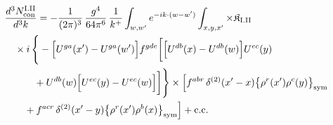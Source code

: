 \begin{align}\label{eq:H-I.II-2}
&\frac{d^{3}N^{\rm I.II}_{{\rm con}}}{d^{3}k}=-\frac{1}{(2\pi)^{3}}\, \frac{g^{4}}{64\pi^{6}}\, \frac{1}{k^{+}} \int_{w,w'}e^{-ik\cdot(w-w')} \int_{x,y,x'} \times \mathfrak{K}_{\rm I.II}\notag\\
&\quad \times i\, \Bigg\{-\Big[U^{ga}(x')-U^{ga}(w')\Big]f^{gde}\bigg[\Big[U^{db}(x)-U^{db}(w)\Big]U^{ec}(y)\notag\\
&\quad\quad\quad +U^{db}(w)\Big[U^{ec}(y)-U^{ec}(w)\Big]\bigg]\Bigg\} \times \Big[f^{abr}\, \delta^{(2)}(x'-x)\big\{\rho^{r}(x')\rho^{c}(y)\big\}_{\rm sym}\notag\\
&\quad\quad +f^{acr}\, \delta^{(2)}(x'-y)\big\{\rho^{r}(x')\rho^{b}(x)\big\}_{\rm sym}\Big] +{\rm c.c.}
\end{align}
